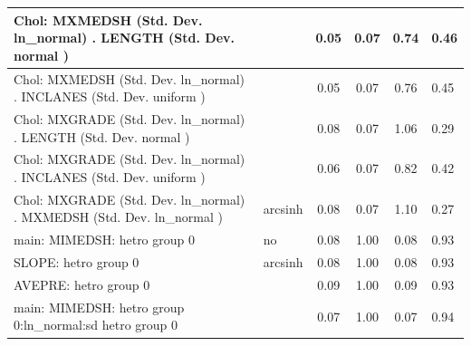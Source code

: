 \begin{table}
\begin{center}
\begin{tabular}{|l|l|c|c|c|l|}
			\hline
			 Chol: MXMEDSH (Std. Dev. ln_normal) . LENGTH (Std. Dev.   normal ) &  & 0.05 & 0.07 & 0.74 & 0.46 \\
			\hline
			 Chol: MXMEDSH (Std. Dev. ln_normal) . INCLANES (Std. Dev.   uniform ) &  & 0.05 & 0.07 & 0.76 & 0.45 \\
			\hline
			 Chol: MXGRADE (Std. Dev. ln_normal) . LENGTH (Std. Dev.   normal ) &  & 0.08 & 0.07 & 1.06 & 0.29 \\
			\hline
			 Chol: MXGRADE (Std. Dev. ln_normal) . INCLANES (Std. Dev.   uniform ) &  & 0.06 & 0.07 & 0.82 & 0.42 \\
			\hline
			 Chol: MXGRADE (Std. Dev. ln_normal) . MXMEDSH (Std. Dev.   ln_normal ) & arcsinh & 0.08 & 0.07 & 1.10 & 0.27 \\
			\hline
			main: MIMEDSH: hetro group 0 & no & 0.08 & 1.00 & 0.08 & 0.93 \\
			\hline
			SLOPE: hetro group 0 & arcsinh & 0.08 & 1.00 & 0.08 & 0.93 \\
			\hline
			AVEPRE: hetro group 0 &  & 0.09 & 1.00 & 0.09 & 0.93 \\
			\hline
			main: MIMEDSH: hetro group 0:ln_normal:sd  hetro group 0 &  & 0.07 & 1.00 & 0.07 & 0.94 \\
			\hline
		\end{tabular}
	\end{center}
\end{table}